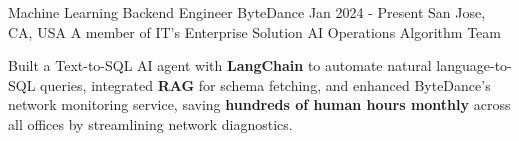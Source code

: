 
\begin{cventries}
  \cventry
    {Machine Learning Backend Engineer} %
    {ByteDance} %
    {Jan 2024 - Present} %
    {San Jose, CA, USA} %
    {A member of IT's Enterprise Solution AI Operations Algorithm Team}
    {
      \begin{cvitems} %
        \item {Built a Text-to-SQL AI agent with \textbf{LangChain} to automate natural language-to-SQL queries, integrated \textbf{RAG} for schema fetching, and enhanced ByteDance’s network monitoring service, saving \textbf{hundreds of human hours monthly} across all offices by streamlining network diagnostics.}
        \item {}
        \item {}
        \item {}
      \end{cvitems}
    }


\end{cventries}
